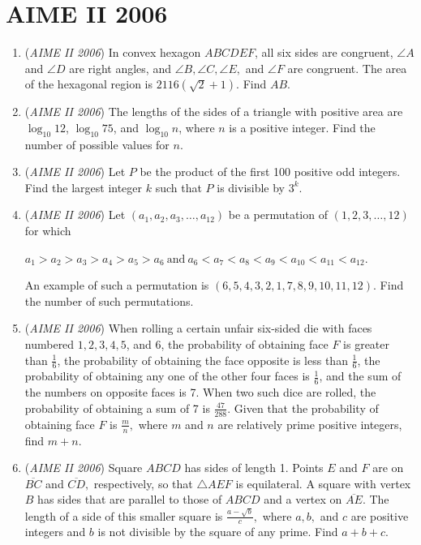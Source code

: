 \section{AIME II 2006}
        \begin{enumerate}
        	\item (\textit{AIME II 2006}) In convex hexagon $ABCDEF$, all six sides are congruent, $\angle A$ and $\angle D$ are right angles, and $\angle B, \angle C, \angle E,$ and $\angle F$ are congruent. The area of the hexagonal region is $2116(\sqrt{2}+1).$ Find $AB$.


 

	\item (\textit{AIME II 2006}) The lengths of the sides of a triangle with positive area are $\log_{10} 12$, $\log_{10} 75$, and $\log_{10} n$, where $n$ is a positive integer. Find the number of possible values for $n$.


 

	\item (\textit{AIME II 2006}) Let $P$ be the product of the first 100 positive odd integers. Find the largest integer $k$ such that $P$ is divisible by $3^k$.


 

	\item (\textit{AIME II 2006}) Let $(a_1,a_2,a_3,\ldots,a_{12})$ be a permutation of $(1,2,3,\ldots,12)$ for which


 $a_1>a_2>a_3>a_4>a_5>a_6 \mathrm{\  and \ } a_6<a_7<a_8<a_9<a_{10}<a_{11}<a_{12}.$

 An example of such a permutation is $(6,5,4,3,2,1,7,8,9,10,11,12).$ Find the number of such permutations.


 

	\item (\textit{AIME II 2006}) When rolling a certain unfair six-sided die with faces numbered $1, 2, 3, 4, 5$, and $6$, the probability of obtaining face $F$ is greater than $\frac{1}{6}$, the probability of obtaining the face opposite is less than $\frac{1}{6}$, the probability of obtaining any one of the other four faces is $\frac{1}{6}$, and the sum of the numbers on opposite faces is 7. When two such dice are rolled, the probability of obtaining a sum of 7 is $\frac{47}{288}$. Given that the probability of obtaining face $F$  is $\frac{m}{n},$ where $m$ and $n$ are relatively prime positive integers, find $m+n.$


	\item (\textit{AIME II 2006}) Square $ABCD$ has sides of length 1. Points $E$ and $F$ are on $\overline{BC}$ and $\overline{CD},$ respectively, so that $\triangle AEF$ is equilateral. A square with vertex $B$ has sides that are parallel to those of $ABCD$ and a vertex on $\overline{AE}.$ The length of a side of this smaller square is $\frac{a-\sqrt{b}}{c},$ where $a, b,$ and $c$ are positive integers and $b$ is not divisible by the square of any prime. Find $a+b+c.$



\end{enumerate}
